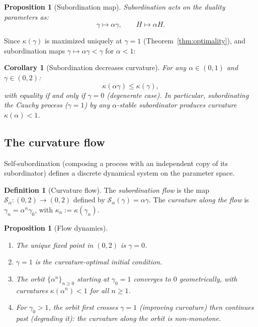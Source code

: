 \documentclass[11pt,a4paper]{article}
\theoremstyle{plain}
\newtheorem{proposition}[theorem]{Proposition}
\newtheorem{corollary}[theorem]{Corollary}
\theoremstyle{definition}
\newtheorem{definition}[theorem]{Definition}
\theoremstyle{remark}
\begin{document}
\begin{proposition}[Subordination map]\label{prop:subordination}
Subordination acts on the duality parameters as:
\begin{equation}\label{eq:sub-map}
  \gamma \mapsto \alpha\gamma,
  \qquad
  H \mapsto \alpha H.
\end{equation}
\end{proposition}

Since $\kappa(\gamma)$ is maximized uniquely at $\gamma = 1$
(Theorem~\ref{thm:optimality}), and subordination maps
$\gamma \mapsto \alpha\gamma < \gamma$ for $\alpha < 1$:

\begin{corollary}[Subordination decreases curvature]
\label{cor:sub-curvature}
For any $\alpha \in (0,1)$ and $\gamma \in (0,2)$:
\[
  \kappa(\alpha\gamma) \leq \kappa(\gamma),
\]
with equality if and only if $\gamma = 0$ (degenerate case).
In particular, subordinating the Cauchy process
($\gamma = 1$) by any $\alpha$-stable subordinator produces
curvature $\kappa(\alpha) < 1$.
\end{corollary}


\subsection{The curvature flow}

Self-subordination (composing a process with an independent copy
of its subordinator) defines a discrete dynamical system on
the parameter space.

\begin{definition}[Curvature flow]\label{def:flow}
The \emph{subordination flow} is the map
$\mathcal{S}_\alpha: (0,2) \to (0,2)$ defined by
$\mathcal{S}_\alpha(\gamma) = \alpha\gamma$.
The \emph{curvature along the flow} is
$\gamma_n = \alpha^n \gamma_0$, with
$\kappa_n := \kappa(\gamma_n)$.
\end{definition}

\begin{proposition}[Flow dynamics]\label{prop:flow}
\begin{enumerate}[label=(\roman*)]
\item The unique fixed point in $(0,2)$ is $\gamma = 0$.
\item $\gamma = 1$ is the curvature-optimal initial condition.
\item The orbit $\{\alpha^n\}_{n \geq 0}$ starting at $\gamma_0 = 1$
  converges to $0$ geometrically, with curvatures
  $\kappa(\alpha^n) < 1$ for all $n \geq 1$.
\item For $\gamma_0 > 1$, the orbit first crosses
  $\gamma = 1$ (improving curvature) then continues past
  (degrading it): the curvature along the orbit is
  non-monotone.
\end{enumerate}
\end{proposition}
\end{document}
